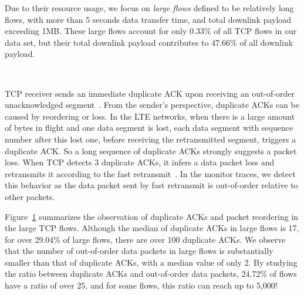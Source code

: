 \label{sec:tcp.tcp}


Due to their resource usage, we focus on \emph{large flows} defined to be relatively long flows, with more than 5 seconds data transfer time, and total downlink payload exceeding 1MB. These large flows account for only 0.33\% of all TCP flows in our data set, but their total downlink payload contributes to  47.66\% of all downlink payload.

\begin{figure}[h]
\centering
{}\\
\label{fig:dup.ack}
\end{figure}

TCP receiver sends an immediate duplicate ACK upon receiving an out-of-order unacknowledged segment~\cite{rfc5681}. From the sender's perspective, duplicate ACKs can be caused by reordering or loss. In the LTE networks, when there is a large amount of bytes in flight and one data segment is lost, each data segment with sequence number after this lost one, before receiving the retransmitted segment, triggers a duplicate ACK. So a long sequence of duplicate ACKs strongly suggests a packet loss. When TCP detects 3 duplicate ACKs, it infers a data packet loss and retransmits it according to the fast retransmit~\cite{rfc5681}. In the monitor traces, we detect this behavior as the data packet sent by fast retransmit is out-of-order relative to other packets.

Figure~\ref{fig:dup.ack} summarizes the observation of duplicate ACKs and packet reordering in the large TCP flows. Although the median of duplicate ACKs in large flows is 17, for over 29.04\% of large flows, there are over 100 duplicate ACKs. We observe that the number of out-of-order data packets in large flows is substantially smaller than that of duplicate ACKs, with a median value of only 2. By studying the ratio between duplicate ACKs and out-of-order data packets, 24.72\% of flows have a ratio of over 25, and for some flows, this ratio can reach up to 5,000!

